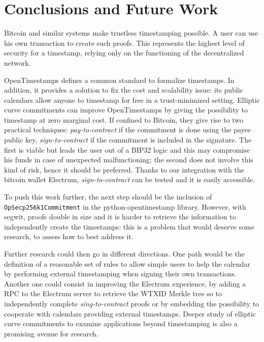 \chapter{Conclusions and Future Work}
\label{chpr:conclusions}
Bitcoin and similar systems make trustless timestamping possible. A user can use his own transaction to create such proofs. This represents the highest level of security for a timestamp, relying only on the functioning of the decentralized network.

OpenTimestamps defines a common standard to formalize timestamps.
In addition, it provides a solution to fix the cost and scalability issue: its public calendars allow anyone to timestamp for free in a trust-minimized setting.
Elliptic curve commitments can improve OpenTimestamps by giving the possibility to timestamp at zero marginal cost. 
If confined to Bitcoin, they give rise to two practical techniques: \textit{pay-to-contract} if the commitment is done using the payee public key, \textit{sign-to-contract} if the commitment is included in the signature. 
The first is viable but leads the user out of a BIP32 logic and this may compromise his funds in case of unexpected malfunctioning; the second does not involve this kind of risk, hence it should be preferred. 
Thanks to our integration with the bitcoin wallet Electrum, \textit{sign-to-contract} can be tested and it is easily accessible.

To push this work further, the next step should be the inclusion of \verb|OpSecp256k1Commitment| in the python-opentimestamp library.
However, with segwit, proofs double in size and it is harder to retrieve the information to independently create the timestamps: this is a problem that would deserve some research, to assess how to best address it.

Further research could then go in different directions.
One path would be the definition of a reasonable set of rules to allow simple users to help the calendar by performing external timestamping when signing their own transactions.
Another one could consist in improving the Electrum experience, by adding a RPC to the Electrum server to retrieve the WTXID Merkle tree so to independently complete \textit{sing-to-contract} proofs or by embedding the possibility to cooperate with calendars providing external timestamps.
Deeper study of elliptic curve commitments to examine applications beyond timestamping \cite{TapRoot} is also a promising avenue for research.
